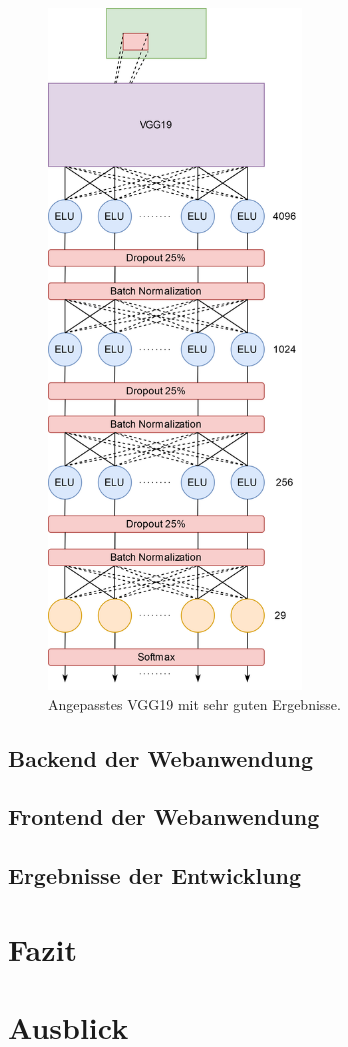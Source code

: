 \documentclass[11pt,bibliography=totocnumbered]{scrartcl}
\begin{document}
\begin{figure}[H]
	\centering
	\includegraphics[width=0.60\textwidth]{vgg_19_used}
	\vspace*{-3mm}
	\caption[Angepasstes VGG19]{Angepasstes VGG19 mit sehr guten Ergebnisse.}
	\label{fig:vgg_19_used}
\end{figure}
\vspace*{-5mm}
\subsection{Backend der Webanwendung}
\subsection{Frontend der Webanwendung}
\subsection{Ergebnisse der Entwicklung}
\section{Fazit} 
\section{Ausblick}
\setcounter{biburllcpenalty}{7000}
\setcounter{biburlucpenalty}{8000}
\pagebreak
\printbibliography[title=Quellen]
\end{document}
